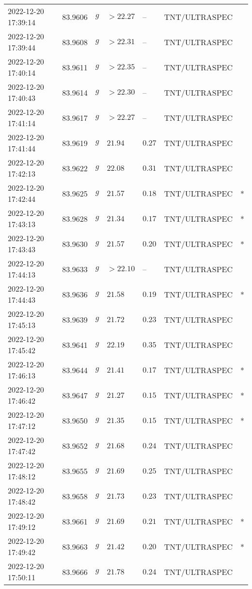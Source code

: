 \documentclass{nature_plusfigure}
\begin{document}
\begin{supplement}
\begin{center}
\begin{longtable}{lllllll}
2022-12-20 17:39:14 & 83.9606 & $g$ & $>22.27$ & -- & TNT/ULTRASPEC &  \\ 
2022-12-20 17:39:44 & 83.9608 & $g$ & $>22.31$ & -- & TNT/ULTRASPEC &  \\ 
2022-12-20 17:40:14 & 83.9611 & $g$ & $>22.35$ & -- & TNT/ULTRASPEC &  \\ 
2022-12-20 17:40:43 & 83.9614 & $g$ & $>22.30$ & -- & TNT/ULTRASPEC &  \\ 
2022-12-20 17:41:14 & 83.9617 & $g$ & $>22.27$ & -- & TNT/ULTRASPEC &  \\ 
2022-12-20 17:41:44 & 83.9619 & $g$ & $21.94$ & $0.27$ & TNT/ULTRASPEC &  \\ 
2022-12-20 17:42:13 & 83.9622 & $g$ & $22.08$ & $0.31$ & TNT/ULTRASPEC &  \\ 
2022-12-20 17:42:44 & 83.9625 & $g$ & $21.57$ & $0.18$ & TNT/ULTRASPEC & * \\ 
2022-12-20 17:43:13 & 83.9628 & $g$ & $21.34$ & $0.17$ & TNT/ULTRASPEC & * \\ 
2022-12-20 17:43:43 & 83.9630 & $g$ & $21.57$ & $0.20$ & TNT/ULTRASPEC & * \\ 
2022-12-20 17:44:13 & 83.9633 & $g$ & $>22.10$ & -- & TNT/ULTRASPEC &  \\ 
2022-12-20 17:44:43 & 83.9636 & $g$ & $21.58$ & $0.19$ & TNT/ULTRASPEC & * \\ 
2022-12-20 17:45:13 & 83.9639 & $g$ & $21.72$ & $0.23$ & TNT/ULTRASPEC &  \\ 
2022-12-20 17:45:42 & 83.9641 & $g$ & $22.19$ & $0.35$ & TNT/ULTRASPEC &  \\ 
2022-12-20 17:46:13 & 83.9644 & $g$ & $21.41$ & $0.17$ & TNT/ULTRASPEC & * \\ 
2022-12-20 17:46:42 & 83.9647 & $g$ & $21.27$ & $0.15$ & TNT/ULTRASPEC & * \\ 
2022-12-20 17:47:12 & 83.9650 & $g$ & $21.35$ & $0.15$ & TNT/ULTRASPEC & * \\ 
2022-12-20 17:47:42 & 83.9652 & $g$ & $21.68$ & $0.24$ & TNT/ULTRASPEC &  \\ 
2022-12-20 17:48:12 & 83.9655 & $g$ & $21.69$ & $0.25$ & TNT/ULTRASPEC &  \\ 
2022-12-20 17:48:42 & 83.9658 & $g$ & $21.73$ & $0.23$ & TNT/ULTRASPEC &  \\ 
2022-12-20 17:49:12 & 83.9661 & $g$ & $21.69$ & $0.21$ & TNT/ULTRASPEC & * \\ 
2022-12-20 17:49:42 & 83.9663 & $g$ & $21.42$ & $0.20$ & TNT/ULTRASPEC & * \\ 
2022-12-20 17:50:11 & 83.9666 & $g$ & $21.78$ & $0.24$ & TNT/ULTRASPEC &  \\ 

\end{longtable}
\end{center}
\end{supplement}
\end{document}
